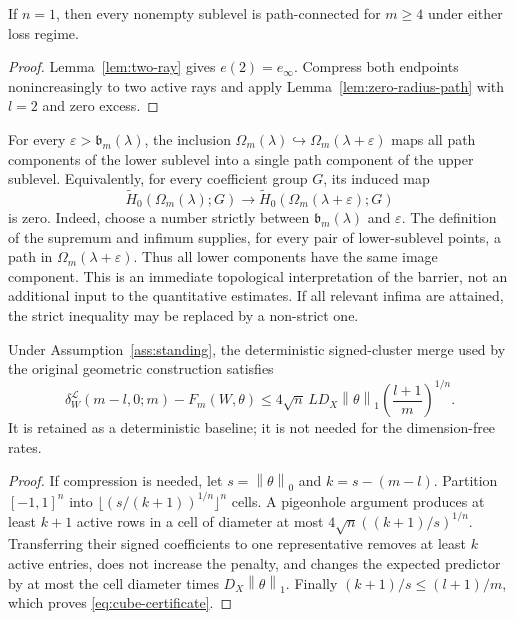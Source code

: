 \documentclass[smallextended,envcountsect]{svjour3}
\newcommand{\norm}[1]{\left\lVert #1 \right\rVert}
\newcommand{\SubBar}{\mathfrak b}
\begin{document}
\begin{corollary}
If $n=1$, then every nonempty sublevel is path-connected for $m\ge4$ under
either loss regime.
\end{corollary}

\begin{proof}
Lemma~\ref{lem:two-ray} gives $e(2)=e_\infty$.  Compress both endpoints
nonincreasingly to two active rays and apply Lemma~\ref{lem:zero-radius-path}
with $l=2$ and zero excess.
\end{proof}

\begin{remark}\label{rem:h0-merge}
For every $\varepsilon>\SubBar_m(\lambda)$, the inclusion
$\Omega_m(\lambda)\hookrightarrow\Omega_m(\lambda+\varepsilon)$ maps all path
components of the lower sublevel into a single path component of the upper
sublevel. Equivalently, for every coefficient group $G$, its induced map
\[
 \widetilde H_0(\Omega_m(\lambda);G)
 \longrightarrow
 \widetilde H_0(\Omega_m(\lambda+\varepsilon);G)
\]
is zero. Indeed, choose a number strictly between $\SubBar_m(\lambda)$ and
$\varepsilon$. The definition of the supremum and infimum supplies, for every
pair of lower-sublevel points, a path in
$\Omega_m(\lambda+\varepsilon)$. Thus all lower components have the same image
component. This is an immediate topological interpretation of the barrier,
not an additional input to the quantitative estimates. If all relevant
infima are attained, the strict inequality may be replaced by a non-strict
one.
\end{remark}

\begin{proposition}\label{prop:cube-merge}
Under Assumption~\ref{ass:standing}, the deterministic signed-cluster merge
used by the original geometric construction satisfies
\begin{equation}
 \delta_W^{\mathcal L}(m-l,0;m)-F_m(W,\theta)
 \le 4\sqrt n\,LD_X\norm{\theta}_1
 \left(\frac{l+1}{m}\right)^{1/n}.
 \label{eq:cube-certificate}
\end{equation}
It is retained as a deterministic baseline; it is not needed for the
dimension-free rates.
\end{proposition}

\begin{proof}
If compression is needed, let $s=\norm{\theta}_0$ and
$k=s-(m-l)$.  Partition $[-1,1]^n$ into
$\lfloor(s/(k+1))^{1/n}\rfloor^n$ cells.  A pigeonhole argument produces at
least $k+1$ active rows in a cell of diameter at most
$4\sqrt n((k+1)/s)^{1/n}$.  Transferring their signed coefficients to one
representative removes at least $k$ active entries, does not increase the
penalty, and changes the expected predictor by at most the cell diameter
times $D_X\norm{\theta}_1$.  Finally
$(k+1)/s\le(l+1)/m$, which proves \eqref{eq:cube-certificate}.
\end{proof}
\end{document}
